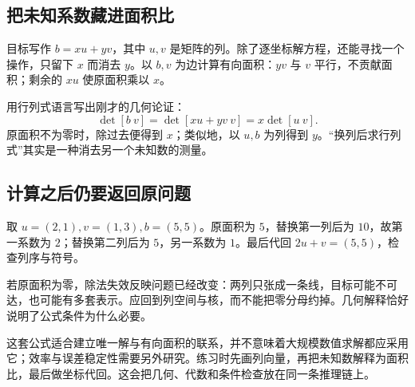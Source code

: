 \subsection*{把未知系数藏进面积比}
目标写作 $b=xu+yv$，其中 $u,v$ 是矩阵的列。除了逐坐标解方程，还能寻找一个操作，只留下 $x$ 而消去 $y$。以 $b,v$ 为边计算有向面积：$yv$ 与 $v$ 平行，不贡献面积；剩余的 $xu$ 使原面积乘以 $x$。

用行列式语言写出刚才的几何论证：
\[\det[b\ v]=\det[xu+yv\ v]=x\det[u\ v].\]
原面积不为零时，除过去便得到 $x$；类似地，以 $u,b$ 为列得到 $y$。“换列后求行列式”其实是一种消去另一个未知数的测量。

\subsection*{计算之后仍要返回原问题}
取 $u=(2,1),v=(1,3),b=(5,5)$。原面积为 $5$，替换第一列后为 $10$，故第一系数为 $2$；替换第二列后为 $5$，另一系数为 $1$。最后代回 $2u+v=(5,5)$，检查列序与符号。

若原面积为零，除法失效反映问题已经改变：两列只张成一条线，目标可能不可达，也可能有多套表示。应回到列空间与核，而不能把零分母约掉。几何解释恰好说明了公式条件为什么必要。

这套公式适合建立唯一解与有向面积的联系，并不意味着大规模数值求解都应采用它；效率与误差稳定性需要另外研究。练习时先画列向量，再把未知数解释为面积比，最后做坐标代回。这会把几何、代数和条件检查放在同一条推理链上。
